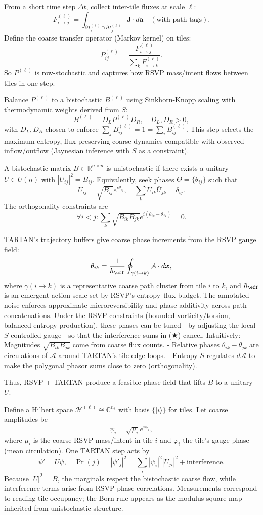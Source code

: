 \documentclass[11pt]{article}
\theoremstyle{plain}
\theoremstyle{definition}
\begin{document}
From a short time step $\Delta t$, collect inter-tile fluxes at scale $\ell$:
\[
F_{i\to j}^{(\ell)} = \int_{\partial T_i^{(\ell)} \cap \partial T_j^{(\ell)}} \bm{J} \cdot d\bm{a} \quad (\text{with path tags}).
\]
Define the coarse transfer operator (Markov kernel) on tiles:
\[
P_{ij}^{(\ell)} = \frac{F_{i\to j}^{(\ell)}}{\sum_k F_{i\to k}^{(\ell)}}.
\]
So $P^{(\ell)}$ is row-stochastic and captures how RSVP mass/intent flows between tiles in one step.

Balance $P^{(\ell)}$ to a bistochastic $B^{(\ell)}$ using Sinkhorn-Knopp scaling with thermodynamic weights derived from $S$:
\[
B^{(\ell)} = D_L P^{(\ell)} D_R, \quad D_L, D_R > 0,
\]
with $D_L, D_R$ chosen to enforce $\sum_j B_{ij}^{(\ell)} = 1 = \sum_i B_{ij}^{(\ell)}$. This step selects the maximum-entropy, flux-preserving coarse dynamics compatible with observed inflow/outflow (Jaynesian inference with $S$ as a constraint).

A bistochastic matrix $B \in \mathbb{R}^{n \times n}$ is unistochastic if there exists a unitary $U \in U(n)$ with $|U_{ij}|^2 = B_{ij}$. Equivalently, seek phases $\Theta = \{\theta_{ij}\}$ such that
\[
U_{ij} = \sqrt{B_{ij}} e^{i \theta_{ij}}, \quad \sum_k U_{ik} \overline{U}_{jk} = \delta_{ij}.
\]
The orthogonality constraints are
\[
\forall i < j: \sum_k \sqrt{B_{ik} B_{jk}} e^{i (\theta_{ik} - \theta_{jk})} = 0. \tag{★}
\]

TARTAN’s trajectory buffers give coarse phase increments from the RSVP gauge field:
\[
\theta_{ik} = \frac{1}{\hbar_{\eff}} \oint_{\gamma(i \to k)} \mathcal{A} \cdot d\bm{x},
\]
where $\gamma(i \to k)$ is a representative coarse path cluster from tile $i$ to $k$, and $\hbar_{\eff}$ is an emergent action scale set by RSVP’s entropy–flux budget. The annotated noise enforces approximate microreversibility and phase additivity across path concatenations. Under the RSVP constraints (bounded vorticity/torsion, balanced entropy production), these phases can be tuned—by adjusting the local $S$-controlled gauge—so that the interference sums in (★) cancel. Intuitively:
- Magnitudes $\sqrt{B_{ik} B_{jk}}$ come from coarse flux counts.
- Relative phases $\theta_{ik} - \theta_{jk}$ are circulations of $\mathcal{A}$ around TARTAN’s tile-edge loops.
- Entropy $S$ regulates $d\mathcal{A}$ to make the polygonal phasor sums close to zero (orthogonality).

Thus, RSVP + TARTAN produce a feasible phase field that lifts $B$ to a unitary $U$.

Define a Hilbert space $\mathcal{H}^{(\ell)} \cong \mathbb{C}^{n_\ell}$ with basis $\{|i\rangle\}$ for tiles. Let coarse amplitudes be
\[
\psi_i = \sqrt{\mu_i} e^{i \varphi_i},
\]
where $\mu_i$ is the coarse RSVP mass/intent in tile $i$ and $\varphi_i$ the tile’s gauge phase (mean circulation). One TARTAN step acts by
\[
\psi' = U \psi, \quad \Pr(j) = |\psi'_j|^2 = \sum_i |\psi_i|^2 |U_{ji}|^2 + \text{interference}.
\]
Because $|U|^2 = B$, the marginals respect the bistochastic coarse flow, while interference terms arise from RSVP phase correlations. Measurements correspond to reading tile occupancy; the Born rule appears as the modulus-square map inherited from unistochastic structure.
\end{document}
